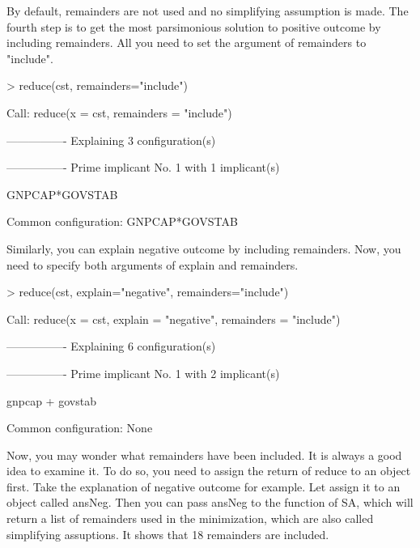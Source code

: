 \documentclass[a4paper]{article}
\begin{document}
By default, remainders are not used and no simplifying assumption is
made. The fourth step is to get the most parsimonious solution to
positive outcome by including remainders. All you need to
set the argument of remainders to "include".

\begin{Schunk}
\begin{Sinput}
> reduce(cst, remainders="include")
\end{Sinput}
\begin{Soutput}
Call:
reduce(x = cst, remainders = "include")


----------------
Explaining 3 configuration(s)

----------------
Prime implicant No. 1 with 1 implicant(s)

GNPCAP*GOVSTAB

Common configuration: GNPCAP*GOVSTAB
\end{Soutput}
\end{Schunk}

Similarly, you can explain negative outcome by including
remainders. Now, you need to specify both arguments of explain and remainders.

\begin{Schunk}
\begin{Sinput}
> reduce(cst, explain="negative", remainders="include")
\end{Sinput}
\begin{Soutput}
Call:
reduce(x = cst, explain = "negative", remainders = "include")


----------------
Explaining 6 configuration(s)

----------------
Prime implicant No. 1 with 2 implicant(s)

gnpcap + govstab

Common configuration: None
\end{Soutput}
\end{Schunk}

Now, you may wonder what remainders have been included. It is always a
good idea to examine it. To do so, you need to assign the return of
reduce to an object first. Take the explanation of negative outcome
for example. Let assign it to an object called ansNeg. Then you can
pass ansNeg to the function of SA, which will return a list of
remainders used in the minimization, which are also called simplifying
assuptions. It shows that 18 remainders are included.
\end{document}

